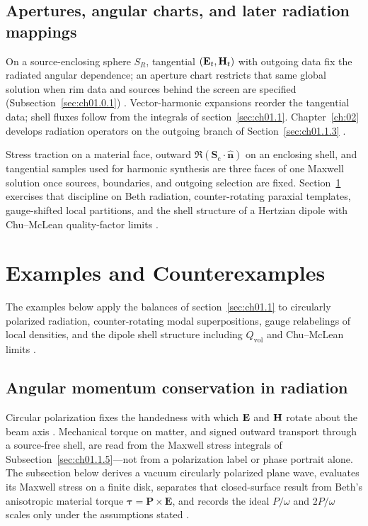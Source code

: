 \subsection{Apertures, angular charts, and later radiation mappings}
\label{sec:ch01.5.4}

On a source-enclosing sphere $S_R$, tangential $(\mathbf{E}_t,\mathbf{H}_t)$ with outgoing data fix the radiated angular dependence; an aperture chart restricts that same global solution when rim data and sources behind the screen are specified (Subsection~\ref{sec:ch01.0.1}) \cite{stratton1941,hansen1988}. Vector-harmonic expansions reorder the tangential data; shell fluxes follow from the integrals of section~\ref{sec:ch01.1}. Chapter~\ref{ch:02} develops radiation operators on the outgoing branch of Section~\ref{sec:ch01.1.3} \cite{harrington2001,tai1994}.

Stress traction on a material face, outward $\Re(\mathbf{S}_\mathrm{c}\cdot\hat{\mathbf{n}})$ on an enclosing shell, and tangential samples used for harmonic synthesis are three faces of one Maxwell solution once sources, boundaries, and outgoing selection are fixed. Section~\ref{sec:ch01.6} exercises that discipline on Beth radiation, counter-rotating paraxial templates, gauge-shifted local partitions, and the shell structure of a Hertzian dipole with Chu--McLean quality-factor limits \cite{beth1936,stratton1941,chu1948}.

\section{Examples and Counterexamples}
\label{sec:ch01.6}

The examples below apply the balances of section~\ref{sec:ch01.1} to circularly polarized radiation, counter-rotating modal superpositions, gauge relabelings of local densities, and the dipole shell structure including $Q_{\mathrm{vol}}$ and Chu--McLean limits \cite{stratton1941,beth1936,allen1992,chu1948,mcclean1996}.

\subsection{Angular momentum conservation in radiation}
\label{sec:ch01.6.1}

Circular polarization fixes the handedness with which $\mathbf{E}$ and $\mathbf{H}$ rotate about the beam axis \cite{stratton1941,beth1936}. Mechanical torque on matter, and signed outward transport through a source-free shell, are read from the Maxwell stress integrals of Subsection~\ref{sec:ch01.1.5}---not from a polarization label or phase portrait alone. The subsection below derives a vacuum circularly polarized plane wave, evaluates its Maxwell stress on a finite disk, separates that closed-surface result from Beth's anisotropic material torque $\boldsymbol{\tau}=\mathbf P\times\mathbf E$, and records the ideal $P/\omega$ and $2P/\omega$ scales only under the assumptions stated \cite{beth1936,stratton1941}.

